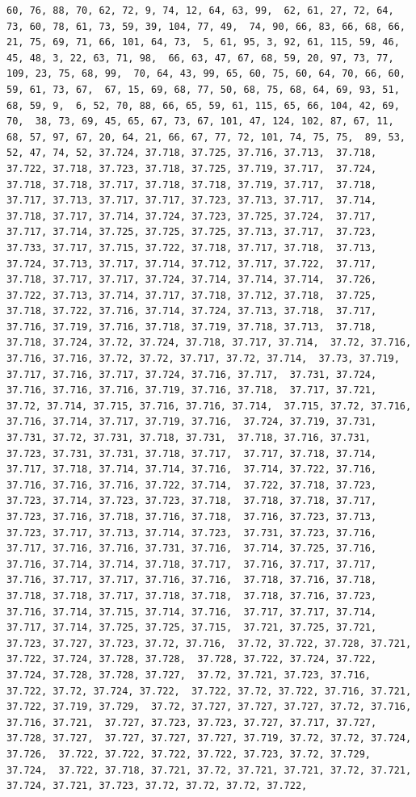 \documentclass[
]{article}
\begin{document}
\begin{verbatim}
60, 76, 88, 70, 62, 72, 9, 74, 12, 64, 63, 99,  62, 61, 27, 72, 64, 73, 60, 78, 61, 73, 59, 39, 104, 77, 49,  74, 90, 66, 83, 66, 68, 66, 21, 75, 69, 71, 66, 101, 64, 73,  5, 61, 95, 3, 92, 61, 115, 59, 46, 45, 48, 3, 22, 63, 71, 98,  66, 63, 47, 67, 68, 59, 20, 97, 73, 77, 109, 23, 75, 68, 99,  70, 64, 43, 99, 65, 60, 75, 60, 64, 70, 66, 60, 59, 61, 73, 67,  67, 15, 69, 68, 77, 50, 68, 75, 68, 64, 69, 93, 51, 68, 59, 9,  6, 52, 70, 88, 66, 65, 59, 61, 115, 65, 66, 104, 42, 69, 70,  38, 73, 69, 45, 65, 67, 73, 67, 101, 47, 124, 102, 87, 67, 11,  68, 57, 97, 67, 20, 64, 21, 66, 67, 77, 72, 101, 74, 75, 75,  89, 53, 52, 47, 74, 52, 37.724, 37.718, 37.725, 37.716, 37.713,  37.718, 37.722, 37.718, 37.723, 37.718, 37.725, 37.719, 37.717,  37.724, 37.718, 37.718, 37.717, 37.718, 37.718, 37.719, 37.717,  37.718, 37.717, 37.713, 37.717, 37.717, 37.723, 37.713, 37.717,  37.714, 37.718, 37.717, 37.714, 37.724, 37.723, 37.725, 37.724,  37.717, 37.717, 37.714, 37.725, 37.725, 37.725, 37.713, 37.717,  37.723, 37.733, 37.717, 37.715, 37.722, 37.718, 37.717, 37.718,  37.713, 37.724, 37.713, 37.717, 37.714, 37.712, 37.717, 37.722,  37.717, 37.718, 37.717, 37.717, 37.724, 37.714, 37.714, 37.714,  37.726, 37.722, 37.713, 37.714, 37.717, 37.718, 37.712, 37.718,  37.725, 37.718, 37.722, 37.716, 37.714, 37.724, 37.713, 37.718,  37.717, 37.716, 37.719, 37.716, 37.718, 37.719, 37.718, 37.713,  37.718, 37.718, 37.724, 37.72, 37.724, 37.718, 37.717, 37.714,  37.72, 37.716, 37.716, 37.716, 37.72, 37.72, 37.717, 37.72, 37.714,  37.73, 37.719, 37.717, 37.716, 37.717, 37.724, 37.716, 37.717,  37.731, 37.724, 37.716, 37.716, 37.716, 37.719, 37.716, 37.718,  37.717, 37.721, 37.72, 37.714, 37.715, 37.716, 37.716, 37.714,  37.715, 37.72, 37.716, 37.716, 37.714, 37.717, 37.719, 37.716,  37.724, 37.719, 37.731, 37.731, 37.72, 37.731, 37.718, 37.731,  37.718, 37.716, 37.731, 37.723, 37.731, 37.731, 37.718, 37.717,  37.717, 37.718, 37.714, 37.717, 37.718, 37.714, 37.714, 37.716,  37.714, 37.722, 37.716, 37.716, 37.716, 37.716, 37.722, 37.714,  37.722, 37.718, 37.723, 37.723, 37.714, 37.723, 37.723, 37.718,  37.718, 37.718, 37.717, 37.723, 37.716, 37.718, 37.716, 37.718,  37.716, 37.723, 37.713, 37.723, 37.717, 37.713, 37.714, 37.723,  37.731, 37.723, 37.716, 37.717, 37.716, 37.716, 37.731, 37.716,  37.714, 37.725, 37.716, 37.716, 37.714, 37.714, 37.718, 37.717,  37.716, 37.717, 37.717, 37.716, 37.717, 37.717, 37.716, 37.716,  37.718, 37.716, 37.718, 37.718, 37.718, 37.717, 37.718, 37.718,  37.718, 37.716, 37.723, 37.716, 37.714, 37.715, 37.714, 37.716,  37.717, 37.717, 37.714, 37.717, 37.714, 37.725, 37.725, 37.715,  37.721, 37.725, 37.721, 37.723, 37.727, 37.723, 37.72, 37.716,  37.72, 37.722, 37.728, 37.721, 37.722, 37.724, 37.728, 37.728,  37.728, 37.722, 37.724, 37.722, 37.724, 37.728, 37.728, 37.727,  37.72, 37.721, 37.723, 37.716, 37.722, 37.72, 37.724, 37.722,  37.722, 37.72, 37.722, 37.716, 37.721, 37.722, 37.719, 37.729,  37.72, 37.727, 37.727, 37.727, 37.72, 37.716, 37.716, 37.721,  37.727, 37.723, 37.723, 37.727, 37.717, 37.727, 37.728, 37.727,  37.727, 37.727, 37.727, 37.719, 37.72, 37.72, 37.724, 37.726,  37.722, 37.722, 37.722, 37.722, 37.723, 37.72, 37.729, 37.724,  37.722, 37.718, 37.721, 37.72, 37.721, 37.721, 37.72, 37.721,  37.724, 37.721, 37.723, 37.72, 37.72, 37.72, 37.722, 
\end{verbatim}
\end{document}
